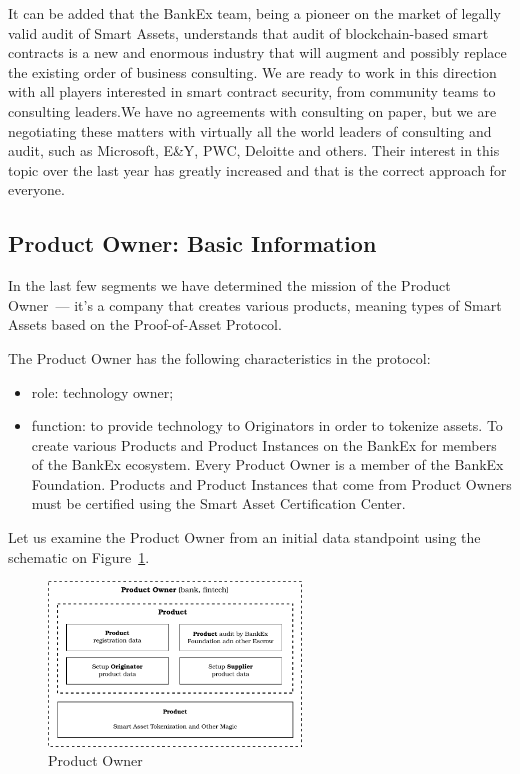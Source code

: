 \documentclass{article}
\begin{document}
\begin{multicols}{2}
It can be added that the BankEx team, being a pioneer on the market of legally valid audit of Smart Assets, understands that audit of blockchain-based smart contracts is a new and enormous industry that will augment and possibly replace the existing order of business consulting. We are ready to work in this direction with all players interested in smart contract security, from community teams to consulting leaders.We have no agreements with consulting on paper, but we are negotiating these matters with virtually all the world leaders of consulting and audit, such as Microsoft, E\&Y, PWC, Deloitte and others. Their interest in this topic over the last year has greatly increased and that is the correct approach for everyone.

\subsection{Product Owner: Basic Information}

In the last few segments we have determined the mission of the Product Owner~--- it’s a company that creates various products, meaning types of Smart Assets based on the Proof-of-Asset Protocol.

The Product Owner has the following characteristics in the protocol:

\begin{itemize}
\item role: technology owner;
\item function: to provide technology to Originators in order to tokenize assets. To create various Products and Product Instances on the BankEx for members of the BankEx ecosystem. Every Product Owner is a member of the BankEx Foundation. Products and Product Instances that come from Product Owners must be  certified using the Smart Asset Certification Center.
\end{itemize}

Let us examine the Product Owner from an initial data standpoint using the schematic on Figure~\ref{fig:product-owner}.

\begin{figure}
  \centering
  \includegraphics[width=0.6\textwidth]{product-owner.pdf}
  \caption{Product Owner}
  \label{fig:product-owner}
\end{figure}


\end{multicols}
\end{document}
